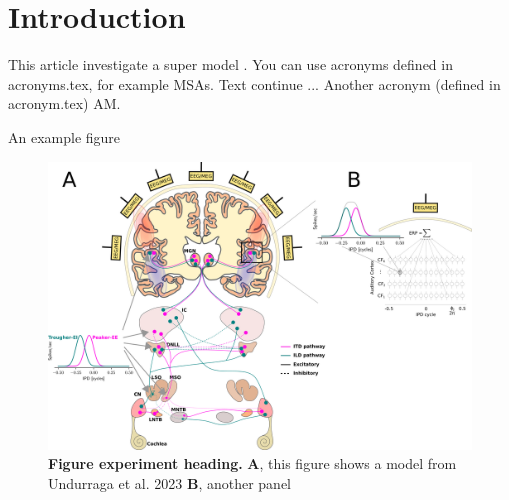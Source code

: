 \section*{Introduction}
\label{sec:Introduction}
\glsresetall

This article investigate a super model \citep{struttTheorySound1877}. 
You can use acronyms defined in acronyms.tex, for example \acp{MSA}.
Text continue ...
Another acronym (defined in acronym.tex) \ac{AM}.

An example figure 

\begin{figure}
	\centering
	\includegraphics[width=16cm]{./figures/figure_example.pdf} %
	\caption{
	\textbf{\color{Black}Figure experiment heading.}
	\textbf{A}, this figure shows a model from Undurraga et al. 2023
	\textbf{B}, another panel
	}
	\label{fig:example_figure_0}
\end{figure}

\lipsum[1-4]